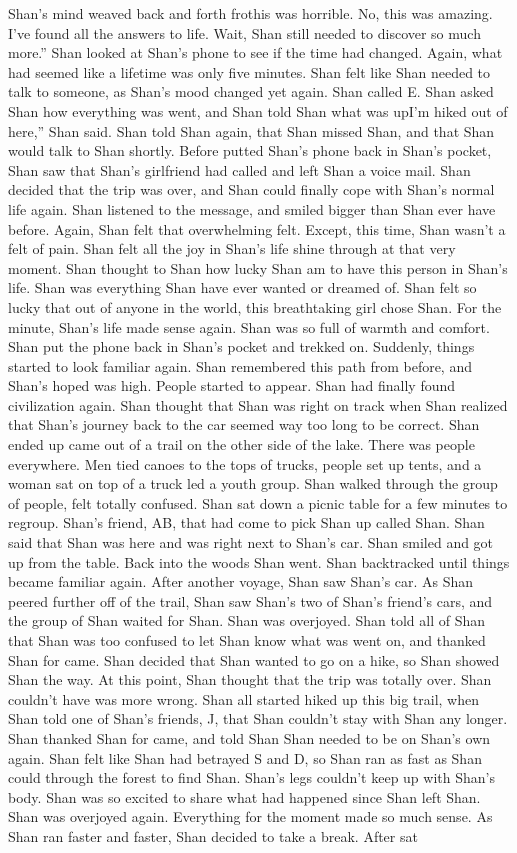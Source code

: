 \documentclass[12pt]{book}
\begin{document}
Shan's mind weaved back and forth frothis was horrible. No, this was amazing. I've found all the answers to life. Wait, Shan still needed to discover so much more.'' Shan looked at Shan's phone to see if the time had changed. Again, what had seemed like a lifetime was only five minutes. Shan felt like Shan needed to talk to someone, as Shan's mood changed yet again. Shan called E. Shan asked Shan how everything was went, and Shan told Shan what was upI'm hiked out of here,'' Shan said. Shan told Shan again, that Shan missed Shan, and that Shan would talk to Shan shortly. Before putted Shan's phone back in Shan's pocket, Shan saw that Shan's girlfriend had called and left Shan a voice mail. Shan decided that the trip was over, and Shan could finally cope with Shan's normal life again. Shan listened to the message, and smiled bigger than Shan ever have before. Again, Shan felt that overwhelming felt. Except, this time, Shan wasn't a felt of pain. Shan felt all the joy in Shan's life shine through at that very moment. Shan thought to Shan how lucky Shan am to have this person in Shan's life. Shan was everything Shan have ever wanted or dreamed of. Shan felt so lucky that out of anyone in the world, this breathtaking girl chose Shan. For the minute, Shan's life made sense again. Shan was so full of warmth and comfort. Shan put the phone back in Shan's pocket and trekked on. Suddenly, things started to look familiar again. Shan remembered this path from before, and Shan's hoped was high. People started to appear. Shan had finally found civilization again. Shan thought that Shan was right on track when Shan realized that Shan's journey back to the car seemed way too long to be correct. Shan ended up came out of a trail on the other side of the lake. There was people everywhere. Men tied canoes to the tops of trucks, people set up tents, and a woman sat on top of a truck led a youth group. Shan walked through the group of people, felt totally confused. Shan sat down a picnic table for a few minutes to regroup. Shan's friend, AB, that had come to pick Shan up called Shan. Shan said that Shan was here and was right next to Shan's car. Shan smiled and got up from the table. Back into the woods Shan went. Shan backtracked until things became familiar again. After another voyage, Shan saw Shan's car. As Shan peered further off of the trail, Shan saw Shan's two of Shan's friend's cars, and the group of Shan waited for Shan. Shan was overjoyed. Shan told all of Shan that Shan was too confused to let Shan know what was went on, and thanked Shan for came. Shan decided that Shan wanted to go on a hike, so Shan showed Shan the way. At this point, Shan thought that the trip was totally over. Shan couldn't have was more wrong. Shan all started hiked up this big trail, when Shan told one of Shan's friends, J, that Shan couldn't stay with Shan any longer. Shan thanked Shan for came, and told Shan Shan needed to be on Shan's own again. Shan felt like Shan had betrayed S and D, so Shan ran as fast as Shan could through the forest to find Shan. Shan's legs couldn't keep up with Shan's body. Shan was so excited to share what had happened since Shan left Shan. Shan was overjoyed again. Everything for the moment made so much sense. As Shan ran faster and faster, Shan decided to take a break. After sat 
\end{document}
